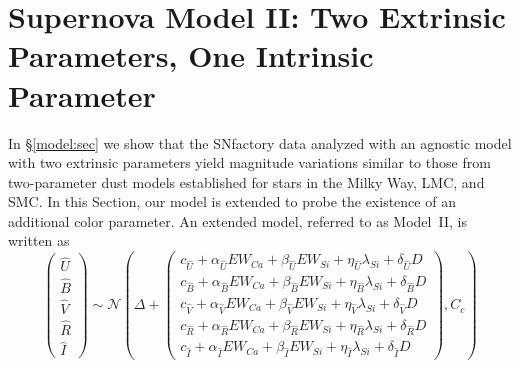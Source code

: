 \documentclass{aastex61}   	%
\begin{document}
\section{Supernova Model II: Two Extrinsic Parameters, One Intrinsic Parameter}
\label{model2:sec}
In \S\ref{model:sec} we show that the SNfactory data analyzed with an agnostic model with
two extrinsic parameters yield magnitude variations
similar
to those from  two-parameter dust models established for stars in the Milky Way, LMC, and SMC.
In this Section, our model is extended
to probe the existence of
an additional
color parameter.
An extended model, referred to as Model~II, is written as
\begin{equation}
\begin{pmatrix}
{\hat{U}}\\{\hat{B}}\\{\hat{V}}\\{\hat{R}}\\{\hat{I}}
\end{pmatrix}
\sim \mathcal{N}
\left(
\Delta +
\begin{pmatrix}
c_{\hat{U}}+\alpha_{\hat{U}} EW_{Ca} + \beta_{\hat{U}} EW_{Si} + \eta_{\hat{U}} \lambda_{Si} + \delta_{\hat{U}} D\\
c_{\hat{B}}+\alpha_{\hat{B}} EW_{Ca} + \beta_{\hat{B}} EW_{Si} + \eta_{\hat{B}} \lambda_{Si} + \delta_{\hat{B}} D \\
c_{\hat{V}}+\alpha_{\hat{V}} EW_{Ca} + \beta_{\hat{V}} EW_{Si} + \eta_{\hat{V}} \lambda_{Si} + \delta_{\hat{V}} D\\
c_{\hat{R}}+\alpha_{\hat{R}} EW_{Ca} + \beta_{\hat{R}} EW_{Si} + \eta_{\hat{R}} \lambda_{Si} + \delta_{\hat{R}} D\\
c_{\hat{I}}+\alpha_{\hat{I}} EW_{Ca} + \beta_{\hat{I}} EW_{Si}+ \eta_{\hat{I}} \lambda_{Si} + \delta_{\hat{I}} D
\end{pmatrix}
,C_{c}
\right)
\label{ewsiv2:eqn}
\end{equation}
\end{document}
